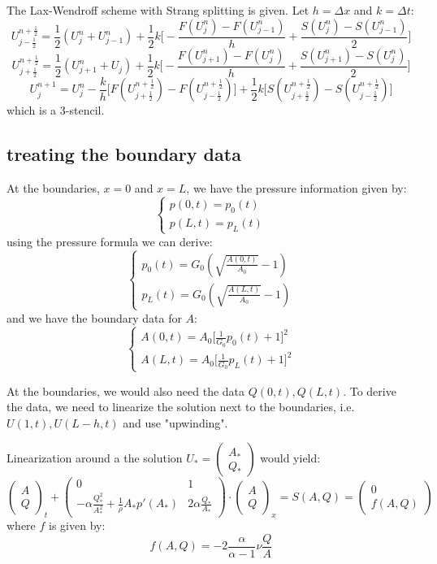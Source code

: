 \documentclass[12pt]{article} %
\begin{document}
The Lax-Wendroff scheme with Strang splitting is given. Let $h = \Delta x$ and $k = \Delta t$:
$$
	U_{j-\frac12}^{n+\frac12} = \frac12 (U_{j}^n + U_{j-1}^{n}) + \frac{1}{2}k\bigg[-\frac{F(U_{j}^n) - F(U_{j-1}^n)}{h} + \frac{S(U_{j}^{n}) - S(U_{j-1}^{n})}{2}\bigg]
$$
$$
	U_{j+\frac12}^{n+\frac12} = \frac12 (U_{j+1}^n + U_{j}) + \frac{1}{2}k\bigg[-\frac{F(U_{j+1}^n) - F(U_{j}^n)}{h} + \frac{S(U_{j+1}^{n}) - S(U_{j}^{n})}{2}\bigg]
$$
$$
	U_{j}^{n+1} = U_{j}^{n} - \frac{k}{h}
	\bigg[F(U_{j+\frac12}^{n+\frac12}) - F(U_{j-\frac12}^{n+\frac12})\bigg] + \frac{1}{2}k \bigg[S(U_{j+\frac12}^{n+\frac12}) - S(U_{j-\frac12}^{n+\frac12})\bigg]
$$ which is a 3-stencil.

\subsection{treating the boundary data}
At the boundaries, $x=0$ and $x=L$, we have the pressure information given by:
$$
	\begin{cases}
		p(0,t) = p_0(t)\\
		p(L,t) = p_{L}(t)
	\end{cases}
$$ using the pressure formula we can derive:
$$
	\begin{cases}
		p_0(t) = G_0(\sqrt{\frac{A(0,t)}{A_0}} - 1)\\
		p_{L}(t)= G_0(\sqrt{\frac{A(L,t)}{A_0}} - 1)
	\end{cases}
$$ and we have the boundary data for $A$:
$$
	\begin{cases}
		A(0,t) = A_0\bigg[\frac{1}{G_0}p_0(t) + 1\bigg]^2 \\
		A(L,t) = A_0\bigg[\frac{1}{G_0}p_L(t) + 1\bigg]^2
	\end{cases}
$$ 

At the boundaries, we would also need the data $Q(0,t), Q(L,t)$. To derive the data, we need to linearize the solution next to the boundaries, i.e. $U(1,t), U(L-h,t)$ and use "upwinding".

Linearization around a the solution $U_{*} = \begin{pmatrix}	A_{*} \\ Q_{*}\end{pmatrix}$ would yield:
\begin{equation}\label{eq:linearize}
	\begin{pmatrix}
		 A \\
		 Q
	\end{pmatrix}_{t}
	+
	\begin{pmatrix}
		 0 & 1 \\
		 -\alpha\frac{Q_{*}^2}{A_{*}^2}+\frac{1}{\rho} A_{*}p'(A_{*}) & 2\alpha\frac{Q_{*}}{A_{*}}
	\end{pmatrix} \cdot 
	\begin{pmatrix}
		 A \\
		 Q
	\end{pmatrix}_{x}
	= S(A,Q) = 
	\begin{pmatrix}
		 0 \\
		 f(A,Q)
	\end{pmatrix}
\end{equation} where $f$ is given by:
$$
	f(A,Q) = -2\frac{\alpha}{\alpha -1}\nu \frac{Q}{A}
$$
\end{document}
